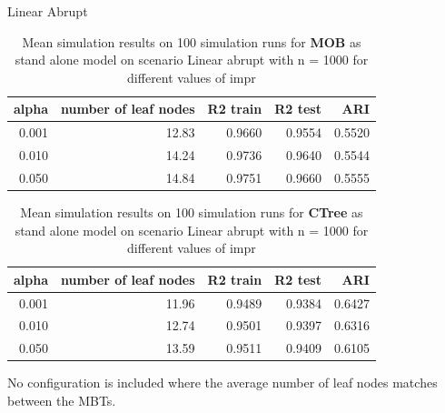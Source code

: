 \documentclass[9pt, xcolor=table]{beamer}
\begin{document}
\begin{frame}{Linear Abrupt}

\begin{table}

\caption{Mean simulation results on 100 simulation runs for \textbf{MOB} as stand alone model on scenario Linear abrupt with n = 1000 for different values of impr }
\centering
\begin{tabular}[t]{r|r|r|r|r}
\hline
alpha & number of leaf nodes & R2 train & R2 test & ARI\\
\hline
0.001 & 12.83 & 0.9660 & 0.9554 & 0.5520\\
\hline
0.010 & 14.24 & 0.9736 & 0.9640 & 0.5544\\
\hline
0.050 & 14.84 & 0.9751 & 0.9660 & 0.5555\\
\hline
\end{tabular}
\end{table}  

\begin{table}

\caption{Mean simulation results on 100 simulation runs for \textbf{CTree} as stand alone model on scenario Linear abrupt with n = 1000 for different values of impr }
\centering
\begin{tabular}[t]{r|r|r|r|r}
\hline
alpha & number of leaf nodes & R2 train & R2 test & ARI\\
\hline
0.001 & 11.96 & 0.9489 & 0.9384 & 0.6427\\
\hline
0.010 & 12.74 & 0.9501 & 0.9397 & 0.6316\\
\hline
0.050 & 13.59 & 0.9511 & 0.9409 & 0.6105\\
\hline
\end{tabular}
\end{table}

No configuration is included where the average number of leaf nodes matches between the MBTs.
\end{frame}
\end{document}
